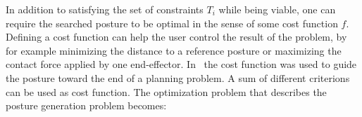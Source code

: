In addition to satisfying the set of constraints $T_i$ while being viable, one can require the searched posture to be optimal in the sense of some cost function $f$.
Defining a cost function can help the user control the result of the problem, by for example minimizing the distance to a reference posture or maximizing the contact force applied by one end-effector.
In~\cite{escande2009} the cost function was used to guide the posture toward the end of a planning problem.
A sum of different criterions can be used as cost function.
The optimization problem that describes the posture generation problem becomes:








